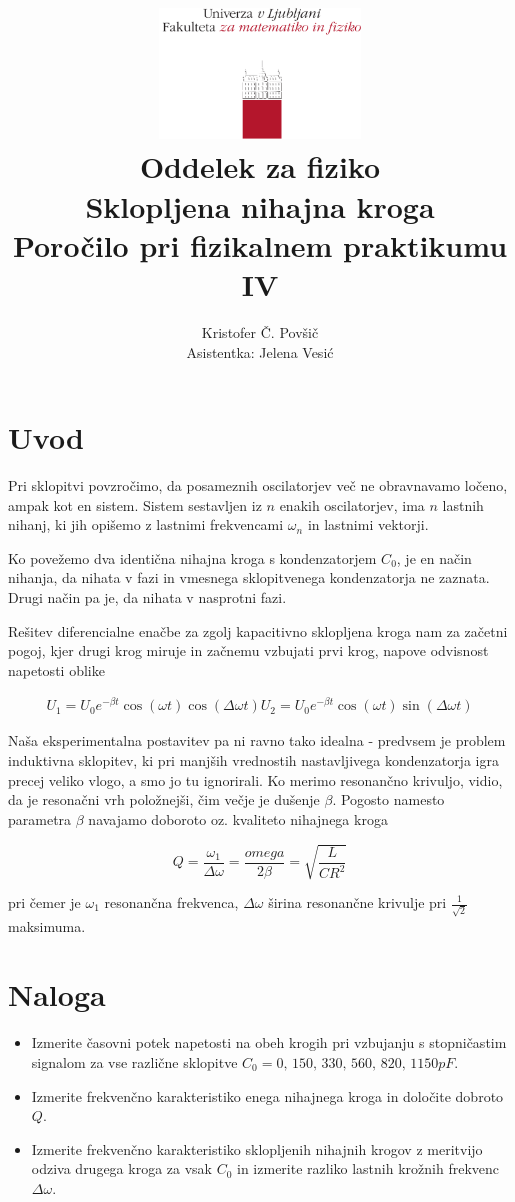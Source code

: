 \documentclass[12pt]{report}
\title{
  \includegraphics[width=0.4\textwidth]{fmf_logo}\\
  {\small Oddelek za fiziko} \\
  {Sklopljena nihajna kroga}\\
  {\small Poročilo pri fizikalnem praktikumu IV}\\

}
\date{}
\author{ Kristofer Č. Povšič \\[5 cm]
 \small  Asistentka: Jelena Vesić
}
\begin{document}
\setcounter{page}{2}

\maketitle

\chapter*{Uvod}

Pri sklopitvi povzročimo, da posameznih oscilatorjev več ne obravnavamo ločeno, ampak kot en sistem. Sistem sestavljen iz $n$ enakih oscilatorjev, ima $n$ lastnih nihanj, ki jih opišemo z lastnimi frekvencami $\omega_n$ in lastnimi vektorji. 

Ko povežemo dva identična nihajna kroga s kondenzatorjem $C_0$, je en način nihanja, da nihata v fazi in vmesnega sklopitvenega kondenzatorja ne zaznata. Drugi način pa je, da nihata v nasprotni fazi. 

Rešitev diferencialne enačbe za zgolj kapacitivno sklopljena kroga nam za začetni pogoj, kjer drugi krog miruje in začnemu vzbujati prvi krog, napove odvisnost napetosti oblike

\[
  \begin{align*}
    U_1 = U_0 e^{-\beta t}\cos(\omega t) \cos (\Delta \omega t)
    U_2 = U_0 e^{-\beta t} \cos(\omega t) \sin (\Delta \omega t)
  \end{align*}
\]

Naša eksperimentalna postavitev pa ni ravno tako idealna - predvsem je problem induktivna sklopitev, ki pri manjših vrednostih nastavljivega kondenzatorja igra precej veliko vlogo, a smo jo tu ignorirali. Ko merimo resonančno krivuljo, vidio, da je resonačni vrh položnejši, čim večje je dušenje $\beta$. Pogosto namesto parametra $\beta$ navajamo doboroto oz. kvaliteto nihajnega kroga 

\begin{equation}
  Q = \frac{\omega_1}{\Delta \omega} = \frac{omega}{2 \beta} = \sqrt{\frac{L}{CR^2}}
\end{equation}

pri čemer je $\omega_1$ resonančna frekvenca, $\Delta \omega$ širina resonančne krivulje pri $\frac{1}{\sqrt{2}}$ maksimuma. 

\chapter*{Naloga}

\begin{itemize}
  \item Izmerite časovni potek napetosti na obeh krogih pri vzbujanju s stopničastim signalom za vse različne sklopitve $C_0 = 0,\, 150,\, 330,\, 560,\, 820,\, 1150 \si{pF}$. 
  \item Izmerite frekvenčno karakteristiko enega nihajnega kroga in določite dobroto $Q$. 
  \item Izmerite frekvenčno karakteristiko sklopljenih nihajnih krogov z meritvijo odziva drugega kroga za vsak $C_0$ in izmerite razliko lastnih krožnih frekvenc $\Delta \omega$. 
\end{itemize}
\end{document}
